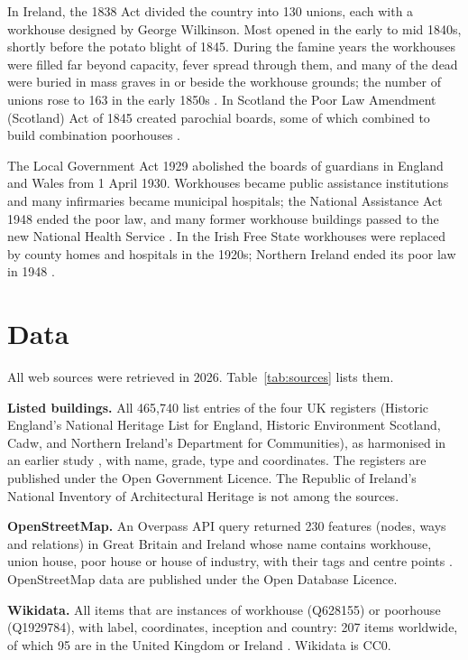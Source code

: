 \documentclass[11pt,a4paper]{article}
\begin{document}
In Ireland, the 1838 Act divided the country into 130 unions, each with a workhouse designed by George Wilkinson. Most opened in the early to mid 1840s, shortly before the potato blight of 1845. During the famine years the workhouses were filled far beyond capacity, fever spread through them, and many of the dead were buried in mass graves in or beside the workhouse grounds; the number of unions rose to 163 in the early 1850s \citep{kinealy,oconnor}. In Scotland the Poor Law Amendment (Scotland) Act of 1845 created parochial boards, some of which combined to build combination poorhouses \citep{higginbotham}.

The Local Government Act 1929 abolished the boards of guardians in England and Wales from 1 April 1930. Workhouses became public assistance institutions and many infirmaries became municipal hospitals; the National Assistance Act 1948 ended the poor law, and many former workhouse buildings passed to the new National Health Service \citep{crowther,fowler}. In the Irish Free State workhouses were replaced by county homes and hospitals in the 1920s; Northern Ireland ended its poor law in 1948 \citep{oconnor}.

\section{Data}
All web sources were retrieved in 2026. Table~\ref{tab:sources} lists them.

\textbf{Listed buildings.} All 465,740 list entries of the four UK registers (Historic England's National Heritage List for England, Historic Environment Scotland, Cadw, and Northern Ireland's Department for Communities), as harmonised in an earlier study \citep{listed}, with name, grade, type and coordinates. The registers are published under the Open Government Licence. The Republic of Ireland's National Inventory of Architectural Heritage is not among the sources.

\textbf{OpenStreetMap.} An Overpass API query returned 230 features (nodes, ways and relations) in Great Britain and Ireland whose name contains workhouse, union house, poor house or house of industry, with their tags and centre points \citep{osm}. OpenStreetMap data are published under the Open Database Licence.

\textbf{Wikidata.} All items that are instances of workhouse (Q628155) or poorhouse (Q1929784), with label, coordinates, inception and country: 207 items worldwide, of which 95 are in the United Kingdom or Ireland \citep{wikidata,qlever}. Wikidata is CC0.
\end{document}
